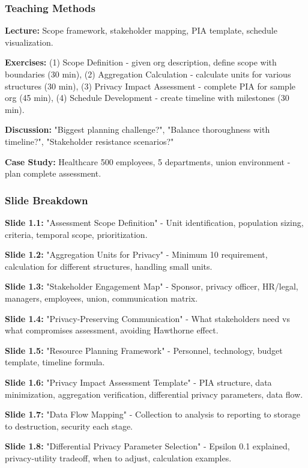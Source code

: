 \documentclass[11pt,a4paper]{article}
\begin{document}
\subsubsection{Teaching Methods}

\textbf{Lecture:} Scope framework, stakeholder mapping, PIA template, schedule visualization.

\textbf{Exercises:} (1) Scope Definition - given org description, define scope with boundaries (30 min), (2) Aggregation Calculation - calculate units for various structures (30 min), (3) Privacy Impact Assessment - complete PIA for sample org (45 min), (4) Schedule Development - create timeline with milestones (30 min).

\textbf{Discussion:} "Biggest planning challenge?", "Balance thoroughness with timeline?", "Stakeholder resistance scenarios?"

\textbf{Case Study:} Healthcare 500 employees, 5 departments, union environment - plan complete assessment.

\subsubsection{Slide Breakdown}

\textbf{Slide 1.1:} "Assessment Scope Definition" - Unit identification, population sizing, criteria, temporal scope, prioritization.

\textbf{Slide 1.2:} "Aggregation Units for Privacy" - Minimum 10 requirement, calculation for different structures, handling small units.

\textbf{Slide 1.3:} "Stakeholder Engagement Map" - Sponsor, privacy officer, HR/legal, managers, employees, union, communication matrix.

\textbf{Slide 1.4:} "Privacy-Preserving Communication" - What stakeholders need vs what compromises assessment, avoiding Hawthorne effect.

\textbf{Slide 1.5:} "Resource Planning Framework" - Personnel, technology, budget template, timeline formula.

\textbf{Slide 1.6:} "Privacy Impact Assessment Template" - PIA structure, data minimization, aggregation verification, differential privacy parameters, data flow.

\textbf{Slide 1.7:} "Data Flow Mapping" - Collection to analysis to reporting to storage to destruction, security each stage.

\textbf{Slide 1.8:} "Differential Privacy Parameter Selection" - Epsilon 0.1 explained, privacy-utility tradeoff, when to adjust, calculation examples.
\end{document}
